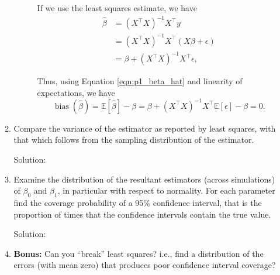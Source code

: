 \documentclass[letterpaper,11pt]{article}
\begin{document}
\begin{enumerate}
\begin{enumerate}
\begin{description}
      If we use the least squares estimate, we have
      \begin{align}
        \hat{\beta}
        &= \left(X^\intercal X\right)^{-1}X^\intercal y \nonumber\\
        &= \left(X^\intercal X\right)^{-1}X^\intercal\left(X\beta + \epsilon \right) \nonumber\\
        &= \beta + \left(X^\intercal X\right)^{-1}X^\intercal\epsilon,
          \label{eqn:p1_beta_hat}
      \end{align}

      Thus, using Equation \ref{eqn:p1_beta_hat} and linearity of expectations,
      we have
      \begin{equation}
        \boxed{
          \operatorname{bias}\left(\hat{\beta}\right) =
          \mathbb{E}\left[\hat{\beta}\right] - \beta =
          \beta +
          \left(X^\intercal X\right)^{-1}X^\intercal
          \mathbb{E}\left[\epsilon\right] - \beta
          = 0.
        }
        \label{eqn:p1_beta_hat_bias}
      \end{equation}
    \end{description}
  \item Compare the variance of the estimator as reported by least squares, with
    that which follows from the sampling distribution of the estimator.

    \begin{description}
    \item[Solution:] 
    \end{description}
    
  \item Examine the distribution of the resultant estimators (across
    simulations) of $\beta_0$ and $\beta_1$, in particular with respect to
    normality. For each parameter find the coverage probability of a 95\%
    confidence interval, that is the proportion of times that the confidence
    intervals contain the true value.

    \begin{description}
    \item[Solution:] 
    \end{description}
    
  \item \textbf{Bonus:} Can you ``break'' least squares? i.e., find a
    distribution of the errors (with mean zero) that produces poor confidence
    interval coverage?
    

\end{enumerate}
\end{enumerate}
\end{document}
